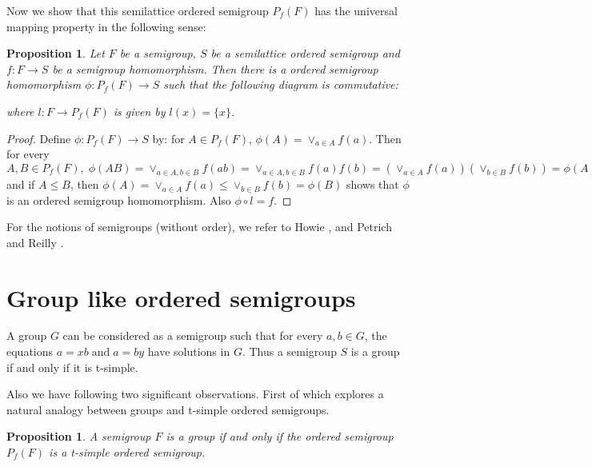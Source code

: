 \documentclass[13pt]{article}
\newtheorem{Proposition}[theorem]{Proposition}
\theoremstyle{definition}
\theoremstyle{remark}
\numberwithin{equation}{section}
\begin{document}
Now we show that this semilattice ordered semigroup $P_f(F)$ has the
universal mapping property in the following sense:
\begin{Proposition}
Let $F$ be a semigroup, $S$ be a semilattice ordered semigroup and
$f : F \longrightarrow S$ be a semigroup homomorphism. Then there is
a ordered semigroup homomorphism $\phi : P_f(F) \longrightarrow S$
such that the following diagram is commutative:
\begin{center}
\end{center}
where $l : F\longrightarrow P_f (F)$ is given by $l(x) = \{x\}$.
\end{Proposition}
\begin{proof}
Define $\phi : P_f(F) \longrightarrow S$ by: for $A \in P_f(F)$, $
\phi(A)=\vee_{a \in A} f(a)$. Then for every $A, B \in P_f(F),
\;\phi(AB)= \vee_{a \in A, b \in B}f(ab)= \vee_{a \in A, b \in
B}f(a)f(b)= (\vee_{a \in A}f(a))(\vee_{b \in B}f(b))= \phi(A)
\phi(B),$ and if $A \leq B$, then $\phi(A) = \vee_{a \in A}f(a) \leq
\vee_{b \in B}f(b) = \phi(B)$ shows that $\phi$ is an ordered
semigroup homomorphism. Also $\phi \circ l = f$.
\end{proof}

For the notions of semigroups (without order), we refer to Howie
\cite{Howie1995},  and Petrich  and Reilly \cite{PRbook}.





\section{Group like ordered semigroups}
A group $G$ can be considered as a semigroup such that for every $a,
b \in G$,  the equations $a = xb \;\textrm{and} \;a = by$ have
solutions in $G$. Thus a semigroup $S$ is a group if and only if it
is t-simple.

Also we have  following two significant observations. First of which
explores a natural analogy between groups and t-simple ordered
semigroups.
\begin{Proposition}\label{cr1}
A semigroup $F$ is a group if and only if the ordered semigroup
$P_f(F)$  is a t-simple ordered semigroup.
\end{Proposition}
\end{document}
